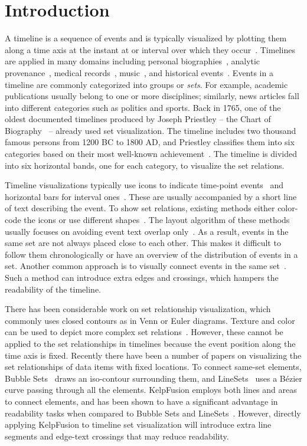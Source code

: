 \section{Introduction}

A timeline is a sequence of events and is typically visualized by plotting them along a time axis at the instant at or interval over which they occur~\cite{Plaisant1996a}. Timelines are applied in many domains including personal biographies~\cite{Plaisant1996a}, analytic provenance~\cite{Xu2015}, medical records~\cite{Plaisant1998}, music~\cite{Andre2007}, and historical events~\cite{Rosenberg2013}. Events in a timeline are commonly categorized into groups or \textit{sets}. For example, academic publications usually belong to one or more disciplines; similarly, news articles fall into different categories such as politics and sports. Back in 1765, one of the oldest documented timelines produced by Joseph Priestley -- the Chart of Biography~\cite{Priestley1765} -- already used set visualization. The timeline includes two thousand famous persons from 1200 BC to 1800 AD, and  Priestley classifies them into six categories based on their most well-known achievement~\cite{Priestley1765B}. The timeline is divided into six horizontal bands, one for each category, to visualize the set relations.

Timeline visualizations typically use icons to indicate time-point events~\cite{SimileTimeline2009} and horizontal bars for interval ones~\cite{Plaisant1996a}. These are usually accompanied by a short line of text describing the event. To show set relations, existing methods either color-code the icons or use different shapes~\cite{TimeGlider2012}. The layout algorithm of these methods usually focuses on avoiding event text overlap only~\cite{SimileTimeline2009,TimeGlider2012}. As a result, events in the same set are not always placed close to each other. This makes it difficult to follow them chronologically or have an overview of the distribution of events in a set. Another common approach is to visually connect events in the same set~\cite{Kumar1998}. Such a method can introduce extra edges and crossings, which hampers the readability of the timeline. 

There has been considerable work on set relationship visualization, which commonly uses closed contours as in Venn or Euler diagrams. Texture and color can be used to depict more complex set relations~\cite{Ware2013}. However, these cannot be applied to the set relationships in timelines because the event position along the time axis is fixed. Recently there have been a number of papers on visualizing the set relationships of data items with fixed locations. To connect same-set elements, Bubble Sets~\cite{Collins2009a} draws an iso-contour surrounding them, and LineSets~\cite{Alper2011} uses a B\'{e}zier curve passing through all the elements. KelpFusion employs both lines and areas to connect elements, and has been shown to have a significant advantage in readability tasks when compared to Bubble Sets and LineSets~\cite{Meulemans2013}. However, directly applying KelpFusion to timeline set visualization will introduce extra line segments and edge-text crossings that may reduce readability.

